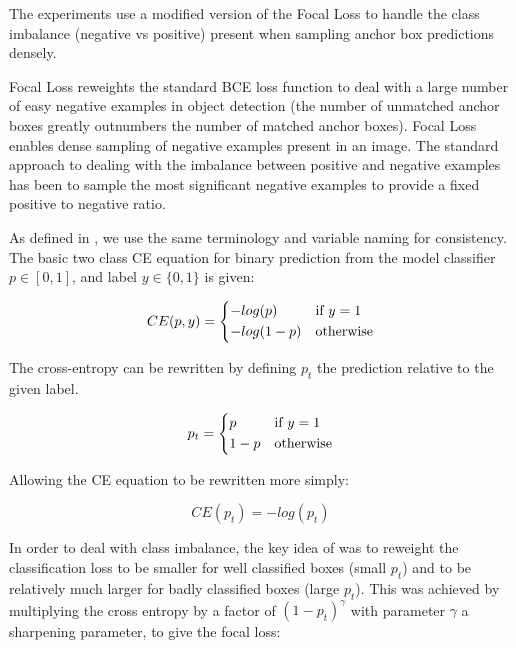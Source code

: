 The experiments use a modified version of the Focal Loss \cite{Lin2017} to handle the class imbalance (negative vs positive) present when sampling anchor box predictions densely.

Focal Loss \cite{Lin2017} reweights the standard \gls{BCE} loss function to deal with a large number of easy negative examples in object detection (the number of unmatched anchor boxes greatly outnumbers the number of matched anchor boxes). Focal Loss enables dense sampling of negative examples present in an image. The standard approach to dealing with the imbalance between positive and negative examples has been to sample the most significant negative examples to provide a fixed positive to negative ratio.

As defined in \cite{Lin2017}, we use the same terminology and variable naming for consistency. The basic two class \gls{CE} equation for binary prediction from the model classifier $p \in \left[0, 1\right]$, and label $y \in \{0, 1\}$  is given:

\begin{equation}
CE(p, y) = 
  \begin{cases*}
  -log(p) & if $y = 1$\\
  -log(1-p) & otherwise\\
  \end{cases*}
\label{eq:cross_entropy}
\end{equation}


The cross-entropy can be rewritten by defining $p_t$ the prediction relative to the given label.

\begin{equation}
p_t = 
  \begin{cases*}
  p & if $y = 1$\\
  1 - p & otherwise\\
  \end{cases*}
\label{eq:class_prob}
\end{equation}

Allowing the \gls{CE} equation to be rewritten more simply:

\begin{equation}
CE(p_t) = -log(p_t)
\label{eq:short_cross_entropy}
\end{equation}


In order to deal with class imbalance, the key idea of \cite{Lin2017} was to reweight the classification loss to be smaller for well classified boxes (small $p_t$) and to be relatively much larger for badly classified boxes (large $p_t$). This was achieved by multiplying the cross entropy by a factor of $(1 - p_t)^\gamma $ with parameter $\gamma$ a sharpening parameter, to give the focal loss:

